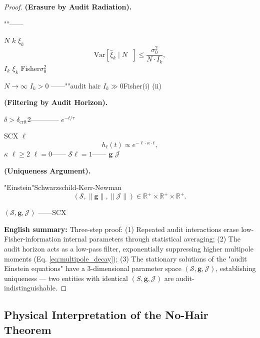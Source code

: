 \documentclass[12pt,a4paper]{article}
\theoremstyle{remark}
\newcommand{\R}{\mathbb{R}}
\newcommand{\Var}{\mathrm{Var}}
\newcommand{\g}{\mathbf{g}}
\newcommand{\cK}{\kappa}     %
\begin{document}
\begin{proof}


\textbf{ (Erasure by Audit Radiation).}

""——

 $N$  $k$  $\xi_k$ 
\begin{equation}
    \Var[\hat{\xi}_k \mid N \text{ }] \leq \frac{\sigma_0^2}{N \cdot I_k},
\end{equation}
 $I_k$  $\xi_k$ Fisher$\sigma_0^2$ 

 $N \to \infty$  $I_k > 0$ ——""audit hair $I_k \gg 0$Fisher(i) (ii) 

\textbf{ (Filtering by Audit Horizon).}

$\delta > \delta_{\mathrm{crit}}$2———— $e^{-t/\tau}$ 

SCX $\ell$ 
\begin{equation}
    h_{\ell}(t) \propto e^{-\ell \cdot \cK \cdot t},
    \label{eq:multipole_decay}
\end{equation}
 $\cK$ $\ell \geq 2$ $\ell = 0$—— $\mathcal{S}$$\ell = 1$—— $\g$  $\mathcal{J}$

\textbf{ (Uniqueness Argument).}

"Einstein"Schwarzschild-Kerr-Newman
\begin{equation}
    (\mathcal{S}, \|\g\|, \|\mathcal{J}\|) \in \R^+ \times \R^+ \times \R^+.
\end{equation}

 $(\mathcal{S}, \g, \mathcal{J})$ \textbf{}——SCX

\textbf{English summary:} Three-step proof: (1) Repeated audit interactions erase low-Fisher-information internal parameters through statistical averaging; (2) The audit horizon acts as a low-pass filter, exponentially suppressing higher multipole moments (Eq. \ref{eq:multipole_decay}); (3) The stationary solutions of the "audit Einstein equations" have a 3-dimensional parameter space $(\mathcal{S}, \g, \mathcal{J})$, establishing uniqueness — two entities with identical $(S, \g, \mathcal{J})$ are audit-indistinguishable.
\end{proof}

\subsection{}
\subsection{Physical Interpretation of the No-Hair Theorem}
\end{document}
